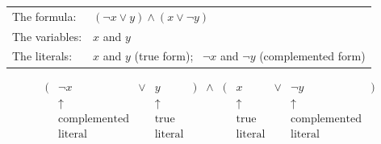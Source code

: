 \begin{tabular}{ll}
{\small\sf The formula}:  & $(\neg {x} \vee y) \wedge (x \vee \neg{y})$ \\
{\small\sf The variables}: & $x$ and $y$ \\
{\small\sf The literals}:  & $x$ and $y$ (true form); \ $\neg {x}$ and $\neg {y}$
(complemented form)
\end{tabular}
\[
\begin{array}{ccccccccccc}
( & \neg {x} & \vee & y & ) & \wedge & ( & x & \vee & \neg{y} & ) \\
  & \uparrow &     & \uparrow & & & & \uparrow & & \uparrow & \\
  & \mbox{complemented} &  & \mbox{true}  & & & & \mbox{true} &
        & \mbox{complemented} &  \\
  & \mbox{literal} & & \mbox{literal} & & & & \mbox{literal} & &
  \mbox{literal} & 
\end{array}
\]

\medskip

